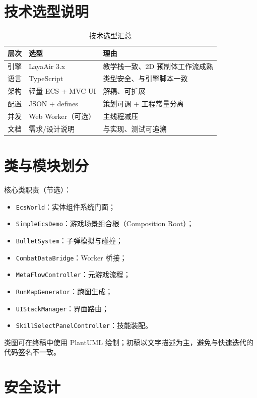 ﻿
\section{技术选型说明}

\begin{table}[htbp]
  \centering
  \caption{技术选型汇总}
  \label{tab:tech-stack}
  \begin{tabular}{lll}
    \toprule
    \textbf{层次} & \textbf{选型} & \textbf{理由} \\
    \midrule
    引擎 & LayaAir 3.x & 教学栈一致、2D 预制体工作流成熟 \\
    语言 & TypeScript & 类型安全、与引擎脚本一致 \\
    架构 & 轻量 ECS + MVC UI & 解耦、可扩展 \\
    配置 & JSON + defines & 策划可调 + 工程常量分离 \\
    并发 & Web Worker（可选） & 主线程减压 \\
    文档 & 需求/设计说明 & 与实现、测试可追溯 \\
    \bottomrule
  \end{tabular}
\end{table}

\section{类与模块划分}

核心类职责（节选）：
\begin{itemize}
  \item \texttt{EcsWorld}：实体组件系统门面；
  \item \texttt{SimpleEcsDemo}：游戏场景组合根（Composition Root）；
  \item \texttt{BulletSystem}：子弹模拟与碰撞；
  \item \texttt{CombatDataBridge}：Worker 桥接；
  \item \texttt{MetaFlowController}：元游戏流程；
  \item \texttt{RunMapGenerator}：跑图生成；
  \item \texttt{UIStackManager}：界面路由；
  \item \texttt{SkillSelectPanelController}：技能装配。
\end{itemize}

类图可在终稿中使用 PlantUML 绘制；初稿以文字描述为主，避免与快速迭代的代码签名不一致。

\section{安全设计}

